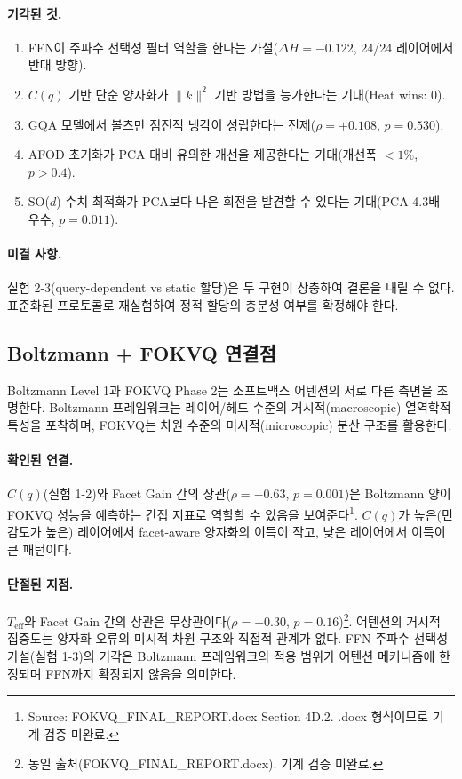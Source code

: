 \documentclass[11pt,a4paper]{article}
\begin{document}
\paragraph{기각된 것.}
\begin{enumerate}[nosep]
  \item FFN이 주파수 선택성 필터 역할을 한다는 가설($\Delta H = -0.122$, 24/24 레이어에서 반대 방향).
  \item $C(q)$ 기반 단순 양자화가 $\|k\|^2$ 기반 방법을 능가한다는 기대(Heat wins: 0).
  \item GQA 모델에서 볼츠만 점진적 냉각이 성립한다는 전제($\rho = +0.108$, $p = 0.530$).
  \item AFOD 초기화가 PCA 대비 유의한 개선을 제공한다는 기대(개선폭 $< 1\%$, $p > 0.4$).
  \item SO($d$) 수치 최적화가 PCA보다 나은 회전을 발견할 수 있다는 기대(PCA 4.3배 우수, $p = 0.011$).
\end{enumerate}

\paragraph{미결 사항.}
실험 2-3(query-dependent vs static 할당)은 두 구현이 상충하여 결론을 내릴 수 없다.
표준화된 프로토콜로 재실험하여 정적 할당의 충분성 여부를 확정해야 한다.

\subsection{Boltzmann + FOKVQ 연결점}

Boltzmann Level 1과 FOKVQ Phase 2는 소프트맥스 어텐션의 서로 다른 측면을 조명한다.
Boltzmann 프레임워크는 레이어/헤드 수준의 거시적(macroscopic) 열역학적 특성을 포착하며, FOKVQ는 차원 수준의 미시적(microscopic) 분산 구조를 활용한다.

\paragraph{확인된 연결.}
$C(q)$(실험 1-2)와 Facet Gain 간의 상관($\rho = -0.63$, $p = 0.001$)은 Boltzmann 양이 FOKVQ 성능을 예측하는 간접 지표로 역할할 수 있음을 보여준다\footnote{Source: FOKVQ\_FINAL\_REPORT.docx Section 4D.2. .docx 형식이므로 기계 검증 미완료.}.
$C(q)$가 높은(민감도가 높은) 레이어에서 facet-aware 양자화의 이득이 작고, 낮은 레이어에서 이득이 큰 패턴이다.

\paragraph{단절된 지점.}
$T_\mathrm{eff}$와 Facet Gain 간의 상관은 무상관이다($\rho = +0.30$, $p = 0.16$)\footnote{동일 출처(FOKVQ\_FINAL\_REPORT.docx). 기계 검증 미완료.}.
어텐션의 거시적 집중도는 양자화 오류의 미시적 차원 구조와 직접적 관계가 없다.
FFN 주파수 선택성 가설(실험 1-3)의 기각은 Boltzmann 프레임워크의 적용 범위가 어텐션 메커니즘에 한정되며 FFN까지 확장되지 않음을 의미한다.
\end{document}
